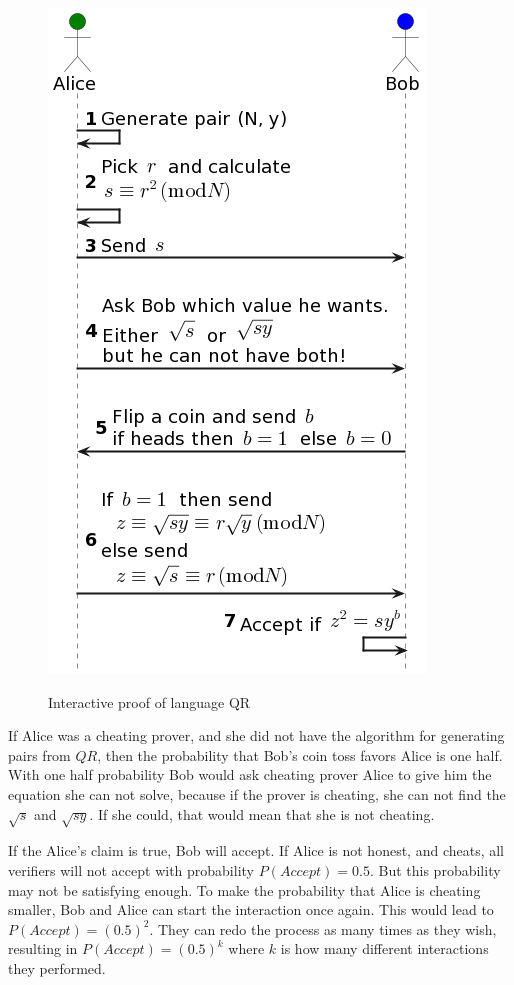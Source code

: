 \documentclass[conference,comsoc,10pt]{IEEEtran}
\begin{document}
        \begin{figure}[h!]
            \centering
            \includegraphics[scale=0.4]{../bachelor/assets/images/qr_ip.png}
            \caption{Interactive proof of language QR}
            \cite{Goldwasser1989, youtubeMOOCLecture1}
            \label{fig:qr_ip}
            \vspace{0.5cm}
        \end{figure}


        If Alice was a cheating prover, and she did not have the algorithm for
        generating pairs from $QR$, then the probability that Bob's coin toss favors
        Alice is one half. With one half probability Bob would ask cheating prover
        Alice to give him the equation she can not solve, because if the prover is
        cheating, she can not find the $\sqrt{s}$ and $\sqrt{sy}$. If she could,
        that would mean that she is not cheating.

        If the Alice's claim is true, Bob will accept. If Alice is not honest, and
        cheats, all verifiers will not accept with probability $P(Accept) = 0.5$.
        But this probability may not be satisfying enough. To make the probability
        that Alice is cheating smaller, Bob and Alice can start the interaction once
        again. This would lead to $P(Accept) = (0.5)^2$. They can redo the process
        as many times as they wish, resulting in $P(Accept) = (0.5)^k$ where $k$
        is how many different interactions they performed.
\end{document}
